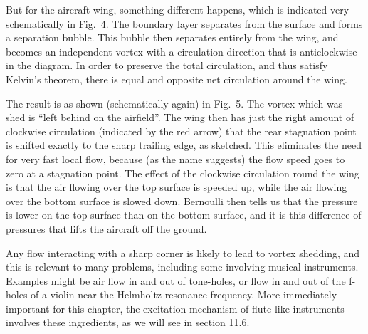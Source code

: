   But for the aircraft wing, something different happens, which is indicated 
  very schematically in Fig.\ 4. The boundary layer separates from the surface 
  and forms a separation bubble. This bubble then separates entirely from the 
  wing, and becomes an independent vortex with a circulation direction that is 
  anticlockwise in the diagram. In order to preserve the total circulation, and 
  thus satisfy Kelvin's theorem, there is equal and opposite net circulation 
  around the wing. 


  The result is as shown (schematically again) in Fig.\ 5. The vortex which was 
  shed is ``left behind on the airfield''. The wing then has just the right 
  amount of clockwise circulation (indicated by the red arrow) that the rear 
  stagnation point is shifted exactly to the sharp trailing edge, as sketched. 
  This eliminates the need for very fast local flow, because (as the name 
  suggests) the flow speed goes to zero at a stagnation point. The effect of 
  the clockwise circulation round the wing is that the air flowing over the top 
  surface is speeded up, while the air flowing over the bottom surface is 
  slowed down. Bernoulli then tells us that the pressure is lower on the top 
  surface than on the bottom surface, and it is this difference of pressures 
  that lifts the aircraft off the ground. 


  Any flow interacting with a sharp corner is likely to lead to vortex 
  shedding, and this is relevant to many problems, including some involving 
  musical instruments. Examples might be air flow in and out of tone-holes, or 
  flow in and out of the f-holes of a violin near the Helmholtz resonance 
  frequency. More immediately important for this chapter, the excitation 
  mechanism of flute-like instruments involves these ingredients, as we will 
  see in section 11.6. 